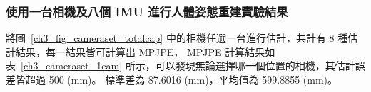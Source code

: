 \subsubsection{使用一台相機及八個 IMU 進行人體姿態重建實驗結果}
將圖~\ref{ch3_fig_cameraset_totalcap} 中的相機任選一台進行估計，共計有 8 種估計結果，每一結果皆可計算出 MPJPE，
MPJPE 計算結果如表~\ref{ch3_cameraset_1cam} 所示，可以發現無論選擇哪一個位置的相機，其估計誤差皆超過 500 (mm)。
標準差為 87.6016 (mm)，平均值為 599.8855 (mm)。
\begin{table}[!ht]
   \caption[一台相機組合與其估計結果誤差]{一台相機組合與其估計結果誤差}
   \centering
   \label{ch3_cameraset_1cam}
   \setlength{\tabcolsep}{3pt}
   \renewcommand\arraystretch{1.5}
\end{table}
\clearpage


